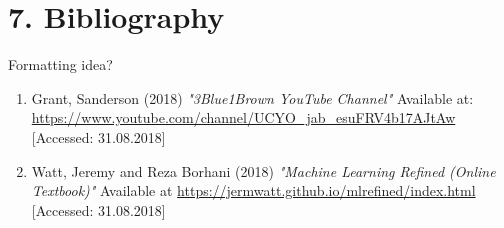 \documentclass[11pt]{article}
\providecommand{\tightlist}{%
      \setlength{\itemsep}{0pt}\setlength{\parskip}{0pt}}
\begin{document}
    \section{7. Bibliography }\label{bibliography}

    Formatting idea?

\begin{enumerate}
\def\labelenumi{\arabic{enumi}.}
\tightlist
\item
  Grant, Sanderson (2018) \emph{"3Blue1Brown YouTube Channel"} Available
  at: \url{https://www.youtube.com/channel/UCYO_jab_esuFRV4b17AJtAw}
  {[}Accessed: 31.08.2018{]}
\item
  Watt, Jeremy and Reza Borhani (2018) \emph{"Machine Learning Refined
  (Online Textbook)"} Available at
  \url{https://jermwatt.github.io/mlrefined/index.html} {[}Accessed:
  31.08.2018{]}
\end{enumerate}


    
    
    
    
\end{document}
